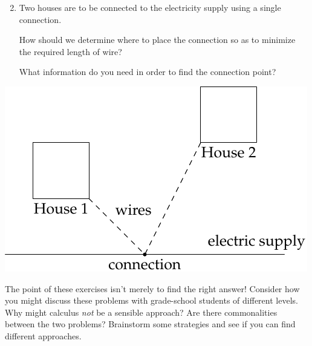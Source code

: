 \begin{minipage}[t]{0.51\linewidth}\vspace{0pt}
\begin{enumerate}\setcounter{enumi}{1}
  \item Two houses are to be connected to the electricity supply using a single connection.\par
  How should we determine where to place the connection so as to minimize the required length of wire?\par
  What information do you need in order to find the connection point?
\end{enumerate}
\end{minipage}\hfill\begin{minipage}[t]{0.48\linewidth}\vspace{0pt}
\flushright\includegraphics[scale=0.9]{intro-elec}
\end{minipage}\medbreak


The point of these exercises isn't merely to find the right answer! Consider how you might discuss these problems with grade-school students of different levels. Why might calculus \emph{not} be a sensible approach? Are there commonalities between the two problems? Brainstorm some strategies and see if you can find different approaches.


